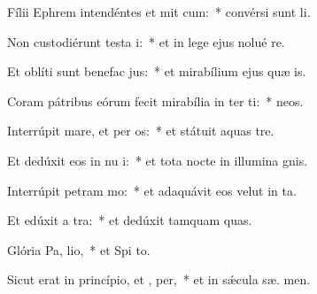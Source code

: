 \item Fílii Ephrem intendéntes et mit cum:~* convérsi sunt   li.
\item Non custodiérunt testa i:~* et in lege ejus nolué re.
\item Et oblíti sunt benefac jus:~* et mirabílium ejus quæ  is.
\item Coram pátribus eórum fecit mirabília in ter ti:~*   neos.
\item Interrúpit mare, et per os:~* et státuit aquas   tre.
\item Et dedúxit eos in nu i:~* et tota nocte in illumina gnis.
\item Interrúpit petram  mo:~* et adaquávit eos velut in  ta.
\item Et edúxit a  tra:~* et dedúxit tamquam  quas.
\item Glória Pa,  lio,~* et Spi to.
\item Sicut erat in princípio, et ,  per,~* et in sǽcula sæ. men.
